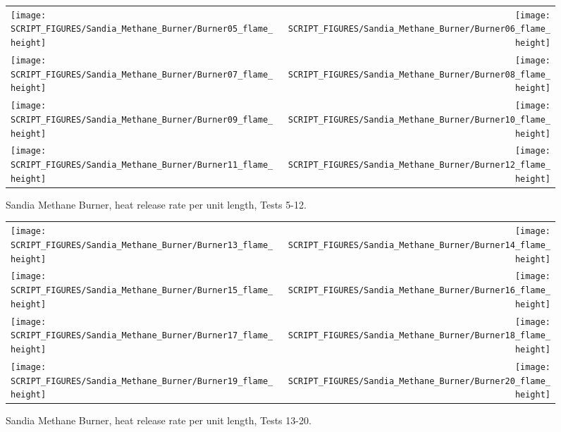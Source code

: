 \begin{figure}[p]
\begin{tabular*}{\textwidth}{l@{\extracolsep{\fill}}r}
\texttt{[image: SCRIPT\_FIGURES/Sandia\_Methane\_Burner/Burner05\_flame\_height]} &
\texttt{[image: SCRIPT\_FIGURES/Sandia\_Methane\_Burner/Burner06\_flame\_height]} \\
\texttt{[image: SCRIPT\_FIGURES/Sandia\_Methane\_Burner/Burner07\_flame\_height]} &
\texttt{[image: SCRIPT\_FIGURES/Sandia\_Methane\_Burner/Burner08\_flame\_height]} \\
\texttt{[image: SCRIPT\_FIGURES/Sandia\_Methane\_Burner/Burner09\_flame\_height]} &
\texttt{[image: SCRIPT\_FIGURES/Sandia\_Methane\_Burner/Burner10\_flame\_height]} \\
\texttt{[image: SCRIPT\_FIGURES/Sandia\_Methane\_Burner/Burner11\_flame\_height]} &
\texttt{[image: SCRIPT\_FIGURES/Sandia\_Methane\_Burner/Burner12\_flame\_height]}
\end{tabular*}
\caption[Sandia Methane Burner, heat release rate per unit length, Tests 5-12]
{Sandia Methane Burner, heat release rate per unit length, Tests 5-12.}
\label{Sandia_Methane_Burner_HRRPUL_2}
\end{figure}

\begin{figure}[p]
\begin{tabular*}{\textwidth}{l@{\extracolsep{\fill}}r}
\texttt{[image: SCRIPT\_FIGURES/Sandia\_Methane\_Burner/Burner13\_flame\_height]} &
\texttt{[image: SCRIPT\_FIGURES/Sandia\_Methane\_Burner/Burner14\_flame\_height]} \\
\texttt{[image: SCRIPT\_FIGURES/Sandia\_Methane\_Burner/Burner15\_flame\_height]} &
\texttt{[image: SCRIPT\_FIGURES/Sandia\_Methane\_Burner/Burner16\_flame\_height]} \\
\texttt{[image: SCRIPT\_FIGURES/Sandia\_Methane\_Burner/Burner17\_flame\_height]} &
\texttt{[image: SCRIPT\_FIGURES/Sandia\_Methane\_Burner/Burner18\_flame\_height]} \\
\texttt{[image: SCRIPT\_FIGURES/Sandia\_Methane\_Burner/Burner19\_flame\_height]} &
\texttt{[image: SCRIPT\_FIGURES/Sandia\_Methane\_Burner/Burner20\_flame\_height]}
\end{tabular*}
\caption[Sandia Methane Burner, heat release rate per unit length, Tests 13-20]
{Sandia Methane Burner, heat release rate per unit length, Tests 13-20.}
\label{Sandia_Methane_Burner_HRRPUL_3}
\end{figure}

